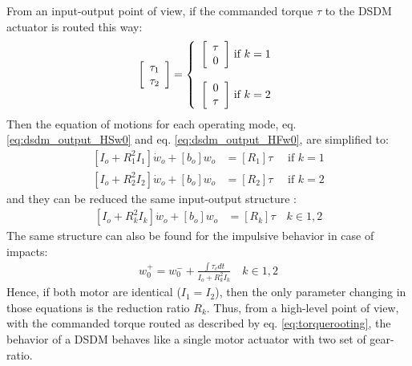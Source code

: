 From an input-output point of view, if the commanded torque $\tau$ to the DSDM actuator is routed this way:
%
\begin{align}
\left[ \begin{array}{c}
\tau_1 \\
\tau_2
\end{array} \right]
 =  
\left\{
\begin{array}{c@{}c}
\left[ \begin{array}{c} \tau \\ 0 \end{array} \right] & \text{ if } k=1  \\ \\
\left[ \begin{array}{c} 0 \\ \tau \end{array} \right] & \text{ if } k=2  \\
\end{array} 
\right. 
\label{eq:torquerooting}
\end{align}
%
Then the equation of motions for each operating mode, eq. \eqref{eq:dsdm_output_HSw0} and eq. \eqref{eq:dsdm_output_HFw0}, are simplified to:
%
\begin{align}
\left[ I_o + R_1^2 I_1 \right] \dot{w}_o +  \left[ b_o \right] w_o  &= \left[ R_1 \right] \tau  \quad \text{ if } k=1  %
\label{eq:dsdm_output_R1} \\
\left[ I_o + R_2^2 I_2 \right] \dot{w}_o +  \left[ b_o \right] w_o  &= \left[ R_2 \right] \tau  \quad \text{ if } k=2  %
\label{eq:dsdm_output_R2}
\end{align}
%
and they can be reduced the same input-output structure :
%
\begin{align}
\left[ I_o + R_k^2 I_k \right] \dot{w}_o +  \left[ b_o \right] w_o  &= \left[ R_k \right] \tau \quad k \in {1,2}
\label{eq:dsdm_output_R} 
\end{align}
%
The same structure can also be found for the impulsive behavior in case of impacts:
%
\begin{align}
w_0^+  =  w_0^- + \frac{\int{\tau_c dt}}{I_o + R_k^2  I_k } \quad k \in {1,2}
\end{align}
%
Hence, if both motor are identical ($I_1=I_2$), then the only parameter changing in those equations is the reduction ratio $R_k$. Thus, from a high-level point of view, with the commanded torque routed as described by eq. \eqref{eq:torquerooting}, the behavior of a DSDM behaves like a single motor actuator with two set of gear-ratio. 


